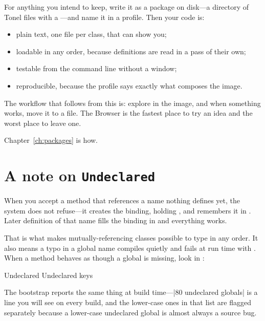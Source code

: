 For anything you intend to keep, write it as a package on disk---a directory
of Tonel files with a ---and name it in a profile. Then your
code is:

\begin{itemize}
\item plain text, one file per class, that  can show you;
\item loadable in any order, because definitions are read in a pass of their
  own;
\item testable from the command line without a window;
\item reproducible, because the profile says exactly what composes the image.
\end{itemize}

The workflow that follows from this is: explore in the image, and when
something works, move it to a file. The Browser is the fastest place to try an
idea and the worst place to leave one.

Chapter~\ref{ch:packages} is how.

\section{A note on \texttt{Undeclared}}

When you accept a method that references a name nothing defines yet, the
system does not refuse---it creates the binding, holding , and
remembers it in . Later definition of that name fills the
binding in and everything works.

That is what makes mutually-referencing classes possible to type in any order.
It also means a typo in a global name compiles quietly and fails at run time
with . When a method behaves as though a global is
missing, look in :

\begin{st}
Undeclared
Undeclared keys
\end{st}

The bootstrap reports the same thing at build time---\ct|80 undeclared globals| is a line you will see on every build, and the lower-case ones in
that list are flagged separately because a lower-case undeclared global is
almost always a source bug.
